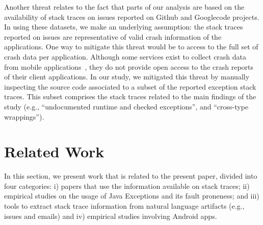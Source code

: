 \documentclass[conference]{IEEEtran}
\begin{document}
Another threat relates to the fact that parts of our analysis 
are based on the availability of stack traces on issues reported on Github and Googlecode projects. 
In using these datasets, we make an underlying assumption: the stack traces reported on issues are 
representative of valid crash information of the applications. 
One way to mitigate this threat would be to access to the full 
set of crash data per application. Although some services exist 
to collect crash data from mobile applications~\cite{BugSe14,BugSn14,Googl14,Acra14},
they do not provide open access to the crash reports of their client applications.
In our study, we mitigated this threat by manually inspecting
the source code associated to a subset of the reported exception stack traces.
This subset comprises the stack traces related to the main findings 
of the study (e.g., ``undocumented runtime and checked exceptions'',
and ``cross-type wrappings'').


\section{Related Work}
\label{sec:rele}

In this section, we present work that is related to the present paper, divided into
four categories: i) papers that use the information available on stack traces;
ii) empirical studies on the usage of Java Exceptions and its fault proneness;
and iii) tools to extract stack trace information from natural language artifacts
(e.g., issues and emails) and iv) empirical studies involving Android apps.
\end{document}
